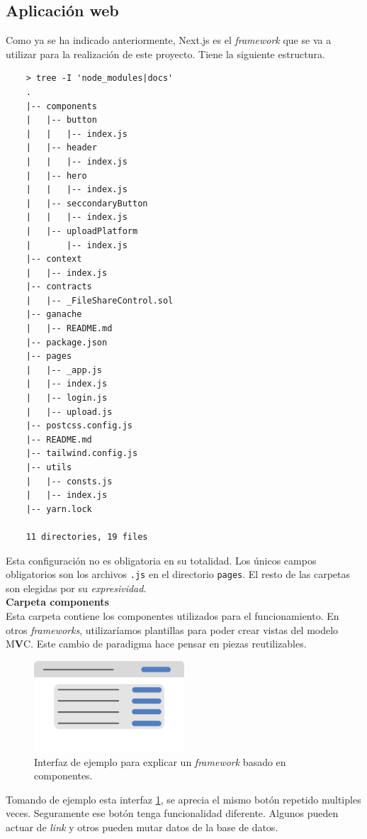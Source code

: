 \subsection{Aplicación web}
Como ya se ha indicado anteriormente, Next.js \cite{web:next.js} es el \textit{framework} que se va a utilizar para la realización de este proyecto.
Tiene la siguiente estructura.
\begin{lstlisting}
    > tree -I 'node_modules|docs'
    .
    |-- components
    |   |-- button
    |   |   |-- index.js
    |   |-- header
    |   |   |-- index.js
    |   |-- hero
    |   |   |-- index.js
    |   |-- seccondaryButton
    |   |   |-- index.js
    |   |-- uploadPlatform
    |       |-- index.js
    |-- context
    |   |-- index.js
    |-- contracts
    |   |-- _FileShareControl.sol
    |-- ganache
    |   |-- README.md
    |-- package.json
    |-- pages
    |   |-- _app.js
    |   |-- index.js
    |   |-- login.js
    |   |-- upload.js
    |-- postcss.config.js
    |-- README.md
    |-- tailwind.config.js
    |-- utils
    |   |-- consts.js
    |   |-- index.js
    |-- yarn.lock

    11 directories, 19 files
\end{lstlisting}
Esta configuración no es obligatoria en su totalidad. Los únicos campos obligatorios son los archivos \verb|.js| en el directorio \verb|pages|.
El resto de las carpetas son elegidas por su \textit{expresividad}.\\
\textbf{Carpeta components}\\
    Esta carpeta contiene los componentes utilizados para el funcionamiento.
    En otros \textit{frameworks}, utilizaríamos plantillas para poder crear vistas del modelo M\textbf{V}C. Este cambio de paradigma hace pensar en piezas reutilizables.
    \begin{figure}[H]
        \centering
        \includegraphics[width=0.5\textwidth]{Figures/Example UI.png}
        \caption{Interfaz de ejemplo para explicar un \textit{framework} basado en componentes.}
        \label{fg:ui}
    \end{figure}
    Tomando de ejemplo esta interfaz \ref{fg:ui}, se aprecia el mismo botón repetido multiples veces. Seguramente ese botón tenga funcionalidad diferente. Algunos pueden actuar de \textit{link} y otros pueden mutar datos de la base de datos.
